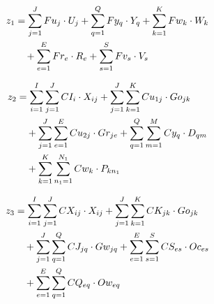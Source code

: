 \documentclass[a4paper]{ifacconf}
\begin{document}
\begin{align}
  z_1 &= \sum_{j=1}^J Fu_j \cdot U_j 
      + \sum_{q=1}^Q Fy_q \cdot Y_q
      + \sum_{k=1}^{K} Fw_k \cdot W_k \notag \\
      &\quad + \sum_{e=1}^{E} Fr_e \cdot R_e
      + \sum_{s=1}^S Fv_s \cdot V_s
      \label{eq:custo1}
\end{align}

\begin{align}
  z_2 &= \sum_{i=1}^I\sum_{j=1}^J CI_i \cdot X_{ij} 
      + \sum_{j=1}^J\sum_{k=1}^K Cu_{1j} \cdot Go_{jk} \notag \\
      &\quad + \sum_{j=1}^J\sum_{e=1}^E Cu_{2j} \cdot Gr_{je} 
      + \sum_{q=1}^Q\sum_{m=1}^M Cy_q \cdot D_{qm} \notag \\
      &\quad + \sum_{k=1}^K\sum_{n_1=1}^{N_1} Cw_k \cdot P_{kn_1}
      \label{eq:custo2}
\end{align}

\begin{align}
  z_3 &= \sum_{i=1}^I\sum_{j=1}^J CX_{ij} \cdot X_{ij} 
      + \sum_{j=1}^J\sum_{k=1}^K CK_{jk} \cdot Go_{jk} \notag \\
      &\quad + \sum_{j=1}^J\sum_{q=1}^Q CJ_{jq} \cdot Gw_{jq}
      + \sum_{e=1}^E\sum_{s=1}^S CS_{es} \cdot Oc_{es} \notag \\
      &\quad + \sum_{e=1}^E\sum_{q=1}^Q CQ_{eq} \cdot Ow_{eq}
      \label{eq:custo3}
\end{align}
\end{document}
